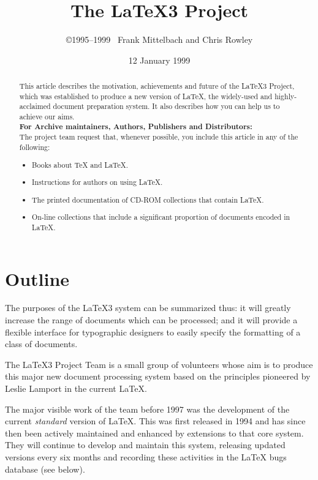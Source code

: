 \documentclass[a4paper]{article}
\title{\Large The \LaTeX3 Project}
\author{\copyright 1995--1999 \
Frank Mittelbach and
Chris Rowley}
\date{12 January 1999}
\begin{document}
\thispagestyle{empty}

\maketitle

\begin{abstract}
  This article describes the motivation, achievements and future of
  the \LaTeX3 Project, which was established to produce a new version
  of \LaTeX{}, the widely-used and highly-acclaimed document
  preparation system.  It also describes how you can help us to
  achieve our aims.\\[2pt]
  \textbf{For Archive maintainers, Authors, Publishers and
          Distributors:}\\
  The project team request that, whenever possible, you include this
  article in any of the following:
  \begin{itemize}
  \item Books about \TeX{} and \LaTeX{}.
  \item Instructions for authors on using \LaTeX{}.
  \item The printed documentation of CD-ROM collections that contain
    \LaTeX.
  \item On-line collections that include a significant proportion of
    documents encoded in \LaTeX.
\end{itemize}
\end{abstract}

\section{Outline}

The purposes of the \LaTeX3 system can be summarized thus: it will
greatly increase the range of documents which can be processed; and it
will provide a flexible interface for typographic designers to easily
specify the formatting of a class of documents.

The \LaTeX3 Project Team is a small group of volunteers whose aim is
to produce this major new document processing system based on the
principles pioneered by Leslie Lamport in the current \LaTeX.

The major visible work of the team before 1997 was the development of
the current \emph{standard} version of \LaTeX{}.  This was first
released in 1994 and has since then been actively maintained and
enhanced by extensions to that core system.  They will continue to
develop and maintain this system, releasing updated versions every six
months and recording these activities in the \LaTeX{} bugs database
(see below).
\end{document}
